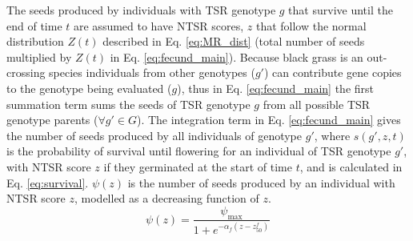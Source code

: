 \documentclass[12pt, a4paper]{article}
\begin{document}
The seeds produced by individuals with TSR genotype $g$ that survive until the end of time $t$ are assumed to have NTSR scores, $z$ that follow the normal distribution $Z(t)$ described in Eq. \ref{eq:MR_dist} (total number of seeds multiplied by $Z(t)$ in Eq. \ref{eq:fecund_main}). Because black grass is an out-crossing species individuals from other genotypes ($g'$) can contribute gene copies to the genotype being evaluated ($g$), thus in Eq. \ref{eq:fecund_main} the first summation term sums the seeds of TSR genotype $g$ from all possible TSR genotype parents ($\forall g' \in G$). The integration term in Eq. \ref{eq:fecund_main} gives the number of seeds produced by all individuals of genotype $g'$, where $s(g', z, t)$ is the probability of survival until flowering for an individual of TSR genotype $g'$, with NTSR score $z$ if they germinated at the start of time $t$, and is calculated in Eq. \ref{eq:survival}. $\psi(z)$ is the number of seeds produced by an individual with NTSR score $z$, modelled as a decreasing function of $z$.
\begin{equation}\label{eq:fecund_seed_num}
	\psi(z) = \frac{\psi_\text{max}}{1 + e^{-\alpha_f(z - z_{50}^f)}}
\end{equation}         
\end{document}

